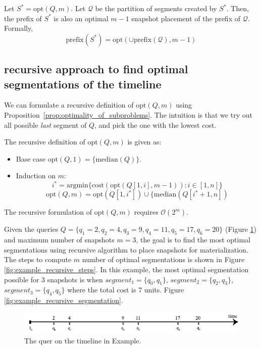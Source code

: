 			\begin{prop}
				Let $S^* = \mathrm{opt}(Q, m)$.  Let $\mathcal{Q}$ be the partition of segments created by $S^*$.  Then, the prefix of $S^*$ is also an optimal $m-1$ snapshot placement of the prefix of $\mathcal{Q}$. Formally, $$\mathrm{prefix}(S^*) = \mathrm{opt}(\cup\mathrm{prefix}(\mathcal{Q}), m-1)$$
			\label{prop:optimality_of_subproblems}
			\end{prop}

		\subsection{recursive approach to find optimal segmentations of the timeline}
			We can formulate a recursive definition of $\mathrm{opt}(Q, m)$ using Proposition~\ref{prop:optimality_of_subproblems}. The intuition is that we try out all possible {\em last} segment of $Q$, and pick the one with the lowest cost.

			The recursive definition of $\mathrm{opt}(Q, m)$ is given as:

			\begin{itemize}
				\item Base case $ \mathrm{opt}(Q, 1) = \{\mathrm{median}(Q)\}$.
				\item Induction on $m$:
				$$i^* = \mathrm{argmin}\{\mathrm{cost}(\mathrm{opt}(Q[1,i], m-1)): i\in[1,
				n]\}$$
				$$
				\mathrm{opt}(Q, m) = \mathrm{opt}(Q[1, i^*]) \cup \{\mathrm{median}(Q[i^*+1, n])
				$$
			\end{itemize}
			The recursive formulation of $\mathrm{opt}(Q, m)$ requires $\mathcal{O}(2^{m})$.

			\begin{example}
				Given the queries $Q=\{q_1=2,q_2=4,q_3=9,q_4=11,q_5=17,q_6=20\}$ (Figure \ref{fig:example_recursive_queries}) and maximum number of snapshots $m=3$, the goal is to find the most optimal segmentations using recursive algorithm to place snapshots for materialization. The steps to compute $m$ number of optimal segmentations is shown in Figure \ref{fig:example_recursive_steps}. In this example, the most optimal segmentation possible for 3 snapshots is when $segment_1 = \{q_0,q_1\}$, $segment_2 = \{q_2,q_3\}$, $segment_3= \{q_4,q_5\}$ where the total cost is 7 units. Figure \ref{fig:example_recursive_segmentation}.
			\label{example:recursive_segmantation}
			\end{example}

			\begin{figure}[b]
				\centering
				\includegraphics[width=\textwidth]{figs/example_recursive_q.pdf}
				\caption{The quer on the timeline in Example.}
				\label{fig:example_recursive_queries}
			\end{figure}

